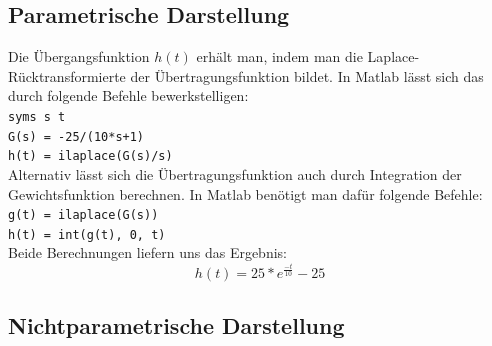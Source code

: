 \subsection{Parametrische Darstellung}
Die Übergangsfunktion $h(t)$ erhält man, indem man die Laplace-Rücktransformierte der Übertragungsfunktion bildet. In Matlab lässt sich das durch folgende Befehle bewerkstelligen:\\
\hspace*{0.5cm}\texttt{syms s t}\\
\hspace*{0.5cm}\texttt{G(s) = -25/(10*s+1)}\\
\hspace*{0.5cm}\texttt{h(t) = ilaplace(G(s)/s)}\\
Alternativ lässt sich die Übertragungsfunktion auch durch Integration der Gewichtsfunktion berechnen. In Matlab benötigt man dafür folgende Befehle:\\
\hspace*{0.5cm}\texttt{g(t) = ilaplace(G(s))}\\
\hspace*{0.5cm}\texttt{h(t) = int(g(t), 0, t)}\\
Beide Berechnungen liefern uns das Ergebnis:
\begin{equation*}
    h(t) = 25*e^{\frac{-t}{10}}-25
\end{equation*}



\subsection{Nichtparametrische Darstellung}
